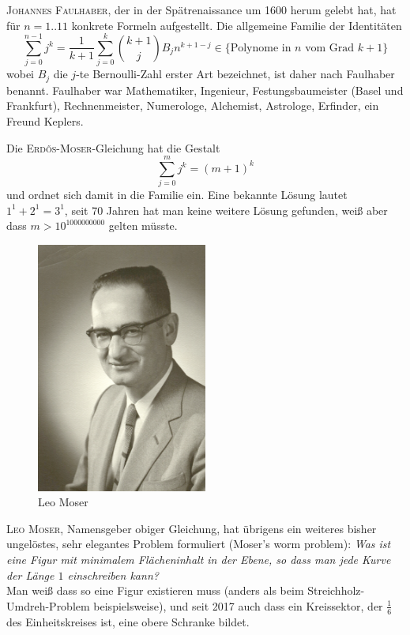 \documentclass[a4paper,11pt,notitlepage,fullpage]{article}
\begin{document}
\begin{enumerate}
\begin{enumerate}
\textsc{Johannes Faulhaber}, der in der Spätrenaissance um 1600 herum gelebt hat, hat für $n=1..11$ konkrete Formeln aufgestellt.
Die allgemeine Familie der Identitäten
$$\sum_{j=0}^{n-1} j^k = \frac{1}{k+1}\sum_{j=0}^k \binom{k+1}{j} B_{j} n^{k+1-j} \in \text{\{Polynome in $n$ vom Grad $k+1$\}}$$
wobei $B_j$ die $j$-te Bernoulli-Zahl erster Art bezeichnet, ist daher nach Faulhaber benannt.
Faulhaber war Mathematiker, Ingenieur, Festungsbaumeister (Basel und Frankfurt), Rechnenmeister, Numerologe, Alchemist, Astrologe, Erfinder, ein Freund Keplers.


Die \textsc{Erdős}-\textsc{Moser}-Gleichung hat die Gestalt
$$\sum_{j=0}^{m} j^k = (m+1)^k$$
und ordnet sich damit in die Familie ein. Eine bekannte Lösung lautet $1^1+2^1=3^1$, seit 70 Jahren hat man keine weitere Lösung gefunden, weiß aber dass $m>10^{1000000000}$ gelten müsste.


\begin{figure}[h!]
\centering
\includegraphics[width=0.5\textwidth]{gfx/Leo_Moser.png}
\caption{Leo Moser}
\end{figure}
\textsc{Leo Moser}, Namensgeber obiger Gleichung, hat übrigens ein weiteres bisher ungelöstes, sehr elegantes Problem formuliert (Moser's worm problem):
\emph{Was ist eine Figur mit minimalem Flächeninhalt in der Ebene, so dass man jede Kurve der Länge $1$ einschreiben kann?}\\
Man weiß dass so eine Figur existieren muss (anders als beim Streichholz-Umdreh-Problem beispielsweise), und seit 2017 auch dass ein Kreissektor, der $\frac{1}{6}$ des Einheitskreises ist, eine obere Schranke bildet.



\end{enumerate}
\end{enumerate}
\end{document}

